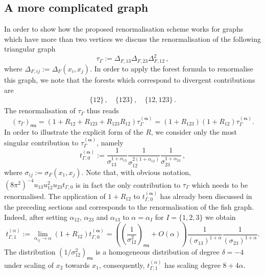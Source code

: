 \documentclass[10pt]{book}
\newcommand{\ms}{\mathsf{ms}}
\theoremstyle{break}
\begin{document}
\subsection{A more complicated graph}


In order to show how the proposed renormalisation scheme works for graphs which have more than two vertices we discuss the renormalisation of the following triangular graph
\[
\tau_\Gamma := \Delta_{F,13}\Delta_{F,23}\Delta_{F,12}^2\,,
\]
where $\Delta_{F,ij}:=\Delta_F(x_i,x_j)$. In order to apply the forest formula %
to renormalise this graph, we note that the forests which correspond to divergent contributions are 
\begin{gather*}
\{12\}\,,\quad\{123\}\,,\quad \{12,123\}\,.
\end{gather*} 
The renormalisation of $\tau_\Gamma$ thus reads
\[
(\tau_\Gamma)_\ms = (1+R_{12}+R_{123}+R_{123}R_{12}) \tau^{(\boldsymbol{\alpha})}_\Gamma   =   (1+R_{123})(1+R_{12}) \tau^{(\boldsymbol{\alpha})}_\Gamma.
\]
In order to illustrate the explicit form of the $R$, we consider only the most singular contribution to $\tau^{(\boldsymbol{\alpha})}_\Gamma$, namely
\[
t_{\Gamma,0}^{(\boldsymbol{\alpha})} := \frac{1}{\sigma_{13}^{1+\alpha_{13}}} \frac{1}{\sigma_{12}^{2(1+\alpha_{12})}} \frac{1}{\sigma_{23}^{1+\alpha_{23}}}\,,
\]
where $\sigma_{ij} := \sigma_F(x_1,x_j)$. Note that, with obvious notation, $(8\pi^2)^{-4}u_{13} u^2_{12} u_{23} t_{\Gamma,0}$ is in fact the only contribution to $\tau_\Gamma$ which needs to be renormalised. The application of $1+R_{12}$ to $t_{\Gamma,0}^{(\boldsymbol{\alpha})}$ has already been discussed in the preceding sections and corresponds to the renormalisation of the fish graph. Indeed, after setting $\alpha_{12}$, $\alpha_{23}$ and $\alpha_{13}$ to $\alpha=\alpha_I$ for $I=\{1,2,3\}$ we obtain
\[
t_{\Gamma,1}^{(\alpha)} := \lim_{\alpha_{ij}\to\alpha}(1+R_{12}) t_{\Gamma,0}^{(\boldsymbol{\alpha})}  = \left(\left(\frac{1}{\sigma_{12}^2}\right)_\ms + O(\alpha)\right)
\frac{1}{(\sigma_{13})^{1+\alpha}} \frac{1}{(\sigma_{23})^{1+\alpha}}.
\]
%
The distribution $(1/\sigma^2_{12})_\ms$ is a homogeneous distribution of degree $\delta=-4$ under scaling of $x_2$ towards $x_1$, consequently, $t_{\Gamma,1}^{(\alpha)}$ has scaling degree $8+4\alpha$. 
\end{document}
